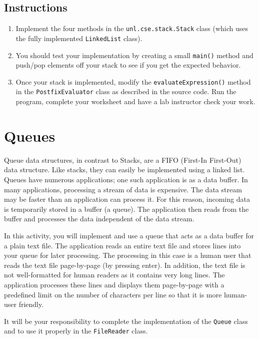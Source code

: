 \documentclass[12pt]{scrartcl}
\begin{document}
\subsection*{Instructions}

\begin{enumerate}
  \item Implement the four methods in the 
    \texttt{unl.cse.stack.Stack} class (which uses the fully 
    implemented \texttt{LinkedList} class).
  \item You should test your implementation by creating a small 
    \texttt{main()} method and push/pop elements off your 
    stack to see if you get the expected behavior.
  \item Once your stack is implemented, modify the 
    \texttt{evaluateExpression()} method in the 
    \texttt{PostfixEvaluator} class as described in the 
    source code.  Run the program, complete your worksheet and have 
    a lab instructor check your work.
\end{enumerate}

\section*{Queues}

Queue data structures, in contrast to Stacks, are a FIFO (First-In 
First-Out) data structure.  Like stacks, they can easily be 
implemented using a linked list.  Queues have numerous applications; 
one such application is as a data buffer.  In many applications, 
processing a stream of data is expensive.  The data stream may be 
faster than an application can process it.  For this reason, incoming 
data is temporarily stored in a buffer (a queue).  The application 
then reads from the buffer and processes the data independent of the 
data stream. 

In this activity, you will implement and use a queue that acts as a 
data buffer for a plain text file.  The application reads an entire 
text file and stores lines into your queue for later processing.  The 
processing in this case is a human user that reads the text file 
page-by-page (by pressing enter).   In addition, the text file is 
not well-formatted for human readers as it contains very long lines.  
The application processes these lines and displays them page-by-page 
with a predefined limit on the number of characters per line so that it is 
more human-user friendly.

It will be your responsibility to complete the implementation of the 
\texttt{Queue} class and to use it properly in the 
\texttt{FileReader} class.
\end{document}
